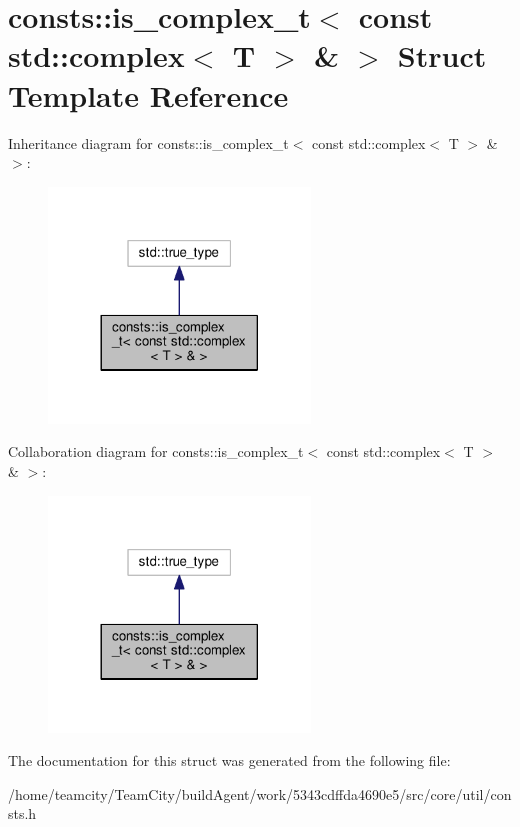 \hypertarget{structconsts_1_1is__complex__t_3_01const_01std_1_1complex_3_01T_01_4_01_6_01_4}{}\section{consts\+:\+:is\+\_\+complex\+\_\+t$<$ const std\+:\+:complex$<$ T $>$ \& $>$ Struct Template Reference}
\label{structconsts_1_1is__complex__t_3_01const_01std_1_1complex_3_01T_01_4_01_6_01_4}


Inheritance diagram for consts\+:\+:is\+\_\+complex\+\_\+t$<$ const std\+:\+:complex$<$ T $>$ \& $>$\+:\nopagebreak
\begin{figure}[H]
\begin{center}
\leavevmode
\includegraphics[width=197pt]{structconsts_1_1is__complex__t_3_01const_01std_1_1complex_3_01T_01_4_01_6_01_4__inherit__graph}
\end{center}
\end{figure}


Collaboration diagram for consts\+:\+:is\+\_\+complex\+\_\+t$<$ const std\+:\+:complex$<$ T $>$ \& $>$\+:\nopagebreak
\begin{figure}[H]
\begin{center}
\leavevmode
\includegraphics[width=197pt]{structconsts_1_1is__complex__t_3_01const_01std_1_1complex_3_01T_01_4_01_6_01_4__coll__graph}
\end{center}
\end{figure}


The documentation for this struct was generated from the following file\+:\begin{DoxyCompactItemize}
\item 
/home/teamcity/\+Team\+City/build\+Agent/work/5343cdffda4690e5/src/core/util/consts.\+h\end{DoxyCompactItemize}
